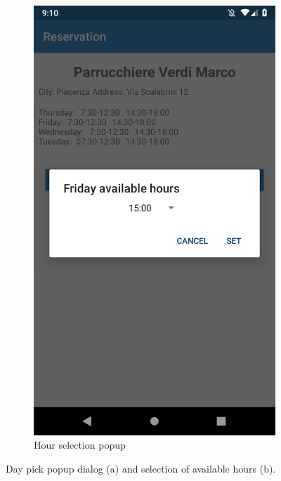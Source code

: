 \begin{figure}[h]
\begin{subfigure}{.5\textwidth}
  \includegraphics[height=.4\textheight, keepaspectratio=true]{Img/Screens/Customer_Search_Selected_Hour}
  \caption{Hour selection popup}
\end{subfigure}%
\caption{Day pick popup dialog (a) and selection of available hours (b).}
\end{figure}

